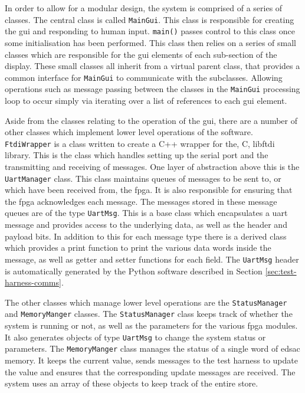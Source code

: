 In order to allow for a modular design, the system is comprised of a series of classes. The central class is called \texttt{MainGui}. This class is responsible for creating the \gls{gui} and responding to human input. \texttt{main()} passes control to this class once some initialisation has been performed. This class then relies on a series of small classes which are responsible for the \gls{gui} elements of each sub-section of the display. These small classes all inherit from a virtual parent class, that provides a common interface for \texttt{MainGui} to communicate with the subclasses. Allowing operations such as message passing between the classes in the \texttt{MainGui} processing loop to occur simply via iterating over a list of references to each \gls{gui} element.

Aside from the classes relating to the operation of the \gls{gui}, there are a number of other classes which implement lower level operations of the software. \texttt{FtdiWrapper} is a class written to create a C++ wrapper for the, C, libftdi library. This is the class which handles setting up the serial port and the transmitting and receiving of messages. One layer of abstraction above this is the \texttt{UartManager} class. This class maintains queues of messages to be sent to, or which have been received from, the \gls{fpga}. It is also responsible for ensuring that the \gls{fpga} acknowledges each message. The messages stored in these message queues are of the type \texttt{UartMsg}. This is a base class which encapsulates a \gls{uart} message and provides access to the underlying data, as well as the header and payload bits. In addition to this for each message type there is a derived class which provides a print function to print the various data words inside the message, as well as getter and setter functions for each field. The \texttt{UartMsg} header is automatically generated by the Python software described in Section \ref{sec:test-harness-comms}.

The other classes which manage lower level operations are the \texttt{StatusManager} and \texttt{MemoryManger} classes. The \texttt{StatusManager} class keeps track of whether the system is running or not, as well as the parameters for the various \gls{fpga} modules. It also generates objects of type \texttt{UartMsg} to change the system status or parameters. The \texttt{MemoryManger} class manages the status of a single word of \gls{edsac} memory. It keeps the current value, sends messages to the test harness to update the value and ensures that the corresponding update messages are received. The system uses an array of these objects to keep track of the entire store.

